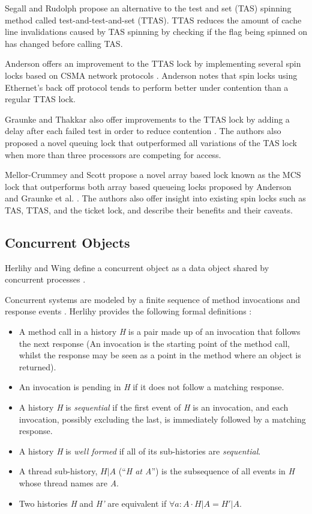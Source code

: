 \documentclass[a4paper, 12pt, titlepage]{article}
\begin{document}
\begin{onehalfspacing}
Segall and Rudolph \cite{rudolph1984dynamic} propose an alternative to the test and set (TAS) spinning method called test-and-test-and-set (TTAS). TTAS reduces the amount of cache line invalidations caused by TAS spinning by checking if the flag being spinned on has changed before calling TAS.

Anderson offers an improvement to the TTAS lock by implementing several spin locks based on CSMA network protocols \cite{anderson1990performance}. Anderson notes that spin locks using Ethernet's back off protocol tends to perform better under contention than a regular TTAS lock.

Graunke and Thakkar also offer improvements to the TTAS lock by adding a delay after each failed test in order to reduce contention \cite{graunke1990synchronization}. The authors also proposed a novel queuing lock that outperformed all variations of the TAS lock when more than three processors are competing for access.

Mellor-Crummey and Scott propose a novel array based lock known as the MCS lock that outperforms both array based queueing locks proposed by Anderson and Graunke et al. \cite{mellor1991algorithms}. The authors also offer insight into existing spin locks such as TAS, TTAS, and the ticket lock, and describe their benefits and their caveats.
\subsection{Concurrent Objects}
Herlihy and Wing define a concurrent object as a data object shared by concurrent processes \cite{herlihy1990linearizability}. 

Concurrent systems are modeled by a finite sequence of method invocations and response events \cite[Chapter~3.6]{herlihy2020art}. Herlihy provides the following formal definitions \cite[Chapter~3.6]{herlihy2020art}:
\begin{itemize}
  \item A method call in a history \emph{H} is a pair made up of an invocation that follows the next response (An invocation is the starting point of the method call, whilst the response may be seen as a point in the method where an object is returned).
  \item An invocation is pending in \emph{H} if it does not follow a matching response.
  \item A history \emph{H} is \emph{sequential} if the first event of \emph{H} is an invocation, and each invocation, possibly excluding the last, is immediately followed by a matching response.
  \item A history \emph{H} is \emph{well formed} if all of its sub-histories are \emph{sequential}.
  \item A thread sub-history, $H|A$  (``\emph{H at A}'') is the subsequence of all events in \emph{H} whose thread names are \emph{A}.
  \item Two histories \emph{H} and \emph{H'} are equivalent if $\forall a:A \cdot H|A = H'|A$.
\end{itemize}


\end{onehalfspacing}
\end{document}
